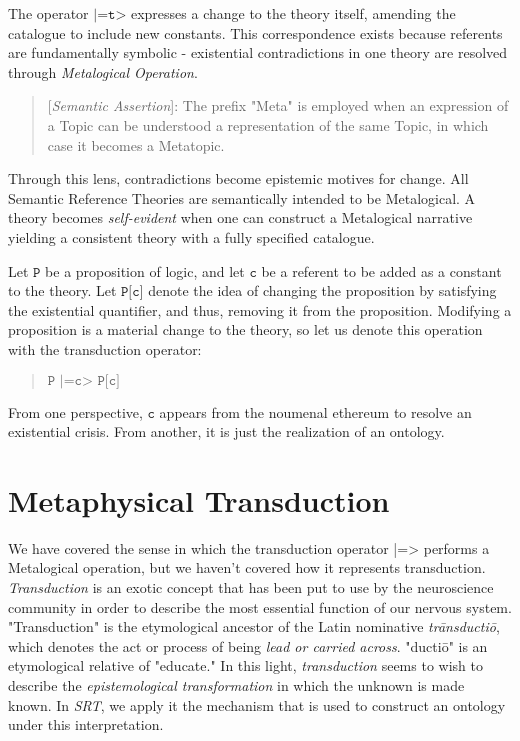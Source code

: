 \documentclass[runningheads]{llncs}
\begin{document}
The operator $\texttt{|=t>}$ expresses a change to the theory itself, amending the catalogue to include new constants. This correspondence exists because referents are fundamentally symbolic - existential contradictions in one theory are resolved through \emph{Metalogical Operation}.

\begin{quote}
[\emph{Semantic Assertion}]: The prefix "Meta" is employed when an expression of a {Topic} can be understood a representation of the same {Topic}, in which case it becomes a Meta{topic}.
\end{quote}

Through this lens, contradictions become epistemic motives for change. All Semantic Reference Theories are semantically intended to be Metalogical. A theory becomes \emph{self-evident} when one can construct a Metalogical narrative yielding a consistent theory with a fully specified catalogue.

Let $\texttt{P}$ be a proposition of logic, and let $\texttt{c}$ be a referent to be added as a constant to the theory. Let $\texttt{P[c]}$ denote the idea of changing the proposition by satisfying the existential quantifier, and thus, removing it from the proposition. Modifying a proposition is a material change to the theory, so let us denote this operation with the transduction operator:

\begin{quote}
$\texttt{P |=c> P[c]}$
\end{quote}

From one perspective, $\texttt{c}$ appears from the noumenal ethereum to resolve an existential crisis. From another, it is just the realization of an ontology.

\section{Metaphysical Transduction}

We have covered the sense in which the transduction operator |=> performs a Metalogical operation, but we haven't covered how it represents transduction. \emph{Transduction} is an exotic concept that has been put to use by the neuroscience community in order to describe the most essential function of our nervous system\cite{Hagins1970}. "Transduction" is the etymological ancestor of the Latin nominative \emph{trānsductiō}, which denotes the act or process of being \emph{lead or carried across}. "ductiō" is an etymological relative of "educate." In this light, \emph{transduction} seems to wish to describe the \emph{epistemological transformation} in which the unknown is made known. In \emph{SRT}, we apply it the mechanism that is used to construct an ontology under this interpretation.
\end{document}
